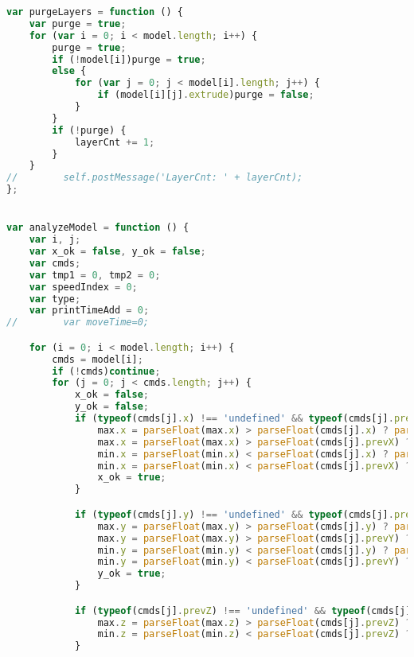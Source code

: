 \begin{lstlisting}[language=JavaScript, label={lst:Worker}, caption=Workerjs is the core gcode to D3 line processor.]
var purgeLayers = function () {
    var purge = true;
    for (var i = 0; i < model.length; i++) {
        purge = true;
        if (!model[i])purge = true;
        else {
            for (var j = 0; j < model[i].length; j++) {
                if (model[i][j].extrude)purge = false;
            }
        }
        if (!purge) {
            layerCnt += 1;
        }
    }
//        self.postMessage('LayerCnt: ' + layerCnt);
};


var analyzeModel = function () {
    var i, j;
    var x_ok = false, y_ok = false;
    var cmds;
    var tmp1 = 0, tmp2 = 0;
    var speedIndex = 0;
    var type;
    var printTimeAdd = 0;
//        var moveTime=0;

    for (i = 0; i < model.length; i++) {
        cmds = model[i];
        if (!cmds)continue;
        for (j = 0; j < cmds.length; j++) {
            x_ok = false;
            y_ok = false;
            if (typeof(cmds[j].x) !== 'undefined' && typeof(cmds[j].prevX) !== 'undefined' && typeof(cmds[j].extrude) !== 'undefined' && cmds[j].extrude && !isNaN(cmds[j].x)) {
                max.x = parseFloat(max.x) > parseFloat(cmds[j].x) ? parseFloat(max.x) : parseFloat(cmds[j].x);
                max.x = parseFloat(max.x) > parseFloat(cmds[j].prevX) ? parseFloat(max.x) : parseFloat(cmds[j].prevX);
                min.x = parseFloat(min.x) < parseFloat(cmds[j].x) ? parseFloat(min.x) : parseFloat(cmds[j].x);
                min.x = parseFloat(min.x) < parseFloat(cmds[j].prevX) ? parseFloat(min.x) : parseFloat(cmds[j].prevX);
                x_ok = true;
            }

            if (typeof(cmds[j].y) !== 'undefined' && typeof(cmds[j].prevY) !== 'undefined' && typeof(cmds[j].extrude) !== 'undefined' && cmds[j].extrude && !isNaN(cmds[j].y)) {
                max.y = parseFloat(max.y) > parseFloat(cmds[j].y) ? parseFloat(max.y) : parseFloat(cmds[j].y);
                max.y = parseFloat(max.y) > parseFloat(cmds[j].prevY) ? parseFloat(max.y) : parseFloat(cmds[j].prevY);
                min.y = parseFloat(min.y) < parseFloat(cmds[j].y) ? parseFloat(min.y) : parseFloat(cmds[j].y);
                min.y = parseFloat(min.y) < parseFloat(cmds[j].prevY) ? parseFloat(min.y) : parseFloat(cmds[j].prevY);
                y_ok = true;
            }

            if (typeof(cmds[j].prevZ) !== 'undefined' && typeof(cmds[j].extrude) !== 'undefined' && cmds[j].extrude && !isNaN(cmds[j].prevZ)) {
                max.z = parseFloat(max.z) > parseFloat(cmds[j].prevZ) ? parseFloat(max.z) : parseFloat(cmds[j].prevZ);
                min.z = parseFloat(min.z) < parseFloat(cmds[j].prevZ) ? parseFloat(min.z) : parseFloat(cmds[j].prevZ);
            }


\end{lstlisting}
